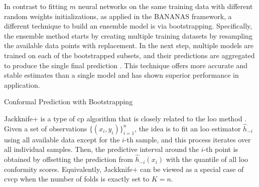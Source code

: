 In contrast to fitting $m$ neural networks on the same training data with different random weights initializations, as applied in the BANANAS framework, a different technique to build an ensemble model is via bootstrapping. Specifically, the ensemble method starts by creating multiple training datasets by resampling the available data points with replacement. In the next step, multiple models are trained on each of the bootstrapped subsets, and their predictions are aggregated to produce the single final prediction \cite{breiman96}. This technique offers more accurate and stable estimates than a single model and has shown superior performance in application.

\begin{algorithm}[t]
  \caption{Conformal Prediction with Bootstrapping}
  \label{alg:BtCP}
  \begin{algorithmic}[1]
    \textbf{Input:} 
    A set of observations $\{(x_{i}, y_{i})\}_{i=1}^n$, number of bootstraps $B$, a prediction algorithm $h(\cdot)$, a non-conformity measure $\myfunc{s(\cdot)}$, nominal mis-coverage rate $\tau$, test data $x_{n+1}$. \vskip
    \textbf{Output:} a prediction set $\mathcal{C}_{\tau}(x_{n+1})}$ that covers $y_{n+1}$ with probability $1-\tau$. \vskip
    \vspace{0.5em}
    \STATE Sample all available data with replacement and create $B$ subsets. $I_b$ denotes the indices of data points included in the $b$-th bootstrap set.
    \STATE Train $\hat{h}_{b}(\cdot)$ on $\{(x_{i}, y_{i}) \mid i \in I_b\}$ for $b$ in 1, 2, ..., B
    \STATE Initialise a conformity scoring set $S=\emptyset$
    \FOR {$i$ in 1, 2, ..., n}
    	\begin{enumerate}
    		\STATE Initialize an empty for leave-one-out estimates $LOO_i=\emptyset$
    		\STATE For {$b$ in 1, 2, ..., B},  if {$i$ \notin \; $I_b$}\;: $LOO_i \leftarrow{LOO_i \cup \hat{h}_b(x_i)}$ 
			\STATE S \gets S \cup s\big(aggregate(LOO_i),\; y_i\big)
		\end{enumerate}
    \ENDFOR
	\STATE Predict $x_{n+1}$: $h(x_{n+1}) \leftarrow aggregate(\{\hat{h}_{1}(x_{n+1}), ..., \hat{h}_{B}(x_{n+1})\})$ 
	\STATE Return $\mathcal{C}_{\tau}(x_{n+1}) \leftarrow \{y \,|\, s((h(x_{n+1}), y) \leq q\}$, where $q$ is the $\lceil(1-\tau)(n_s+1)\rceil$-th smallest value of $S$, with $n_s = |S|$.
    \end{algorithmic}
\end{algorithm}

Jackknife+ is a type of \gls{cp} algorithm that is closely related to the \gls{loo} method \cite{barber2020jackknife}. Given a set of observations $\{(x_{i}, y_{i})\}_{i=1}^n$, the idea is to fit an \gls{loo} estimator $\hat{h}_{-i}$ using all available data except for the $i$-th sample, and this process iterates over all individual samples. Then, the predictive interval around the $i$-th point is obtained by offsetting the prediction from $\hat{h}_{-i}(x_i)$ with the quantile of all \gls{loo} conformity scores.  Equivalently, Jackknife+ can be viewed as a special case of \gls{cvcp} when the number of folds is exactly set to $K=n$.

